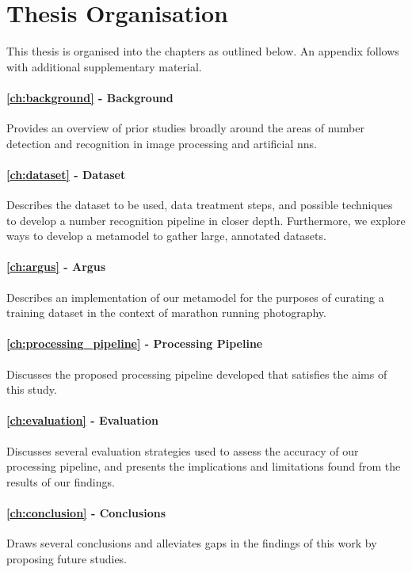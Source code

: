 \section{Thesis Organisation}
\label{sec:introduction:organisation}

This thesis is organised into the chapters as outlined below. An appendix follows with additional supplementary material.

\paragraph{\cref{ch:background} - Background} Provides an overview of prior studies broadly around the areas of number detection and recognition in image processing and artificial \glspl{nn}.

\paragraph{\cref{ch:dataset} - Dataset} Describes the dataset to be used, data treatment steps, and possible techniques to develop a number recognition pipeline in closer depth. Furthermore, we explore ways to develop a metamodel to gather large, annotated datasets.

\paragraph{\cref{ch:argus} - Argus} Describes an implementation of our metamodel for the purposes of curating a training dataset in the context of marathon running photography.

\paragraph{\cref{ch:processing_pipeline} - Processing Pipeline} Discusses the proposed processing pipeline developed that satisfies the aims of this study.

\paragraph{\cref{ch:evaluation} - Evaluation} Discusses several evaluation strategies used to assess the accuracy of our processing pipeline, and presents the implications and limitations found from the results of our findings.

\paragraph{\cref{ch:conclusion} - Conclusions} Draws several conclusions and alleviates gaps in the findings of this work by proposing future studies.
